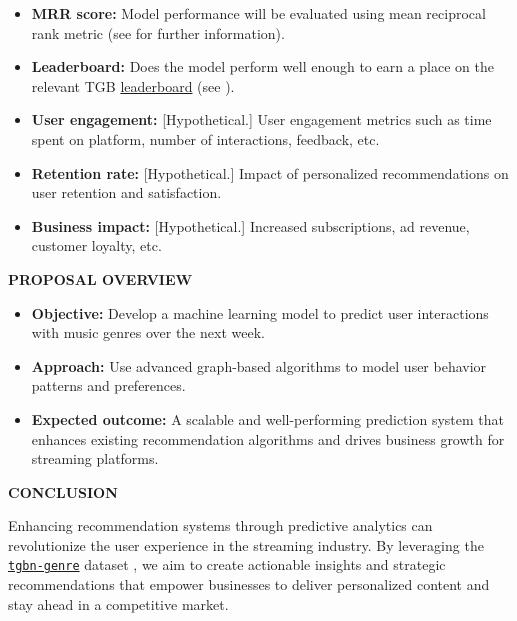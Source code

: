 \documentclass[10pt, letterpaper]{article}
\renewcommand{\section}[1]{%
	    \vspace{\parskip}
		{\large \bfseries\uppercase{#1}}
}
\newcommand{\itemTitle}[1]{%
	{\bfseries{#1}}
}
\begin{document}
\begin{itemize}
\item \itemTitle{MRR score:} Model performance will be evaluated using mean reciprocal rank metric (see \cite{H:2023} for further information).
\item \itemTitle{Leaderboard:} Does the model perform well enough to earn a place on the relevant TGB {\href{https://tgb.complexdatalab.com/docs/leader_nodeprop/\#tgbn-genre}{leaderboard}} (see \cite{H_web:2023}).
\item \itemTitle{User engagement:} [Hypothetical.] User engagement metrics such as time spent on platform, number of interactions, feedback, etc.
\item \itemTitle{Retention rate:} [Hypothetical.] Impact of personalized recommendations on user retention and satisfaction.
\item \itemTitle{Business impact:} [Hypothetical.] Increased subscriptions, ad revenue, customer loyalty, etc.
\end{itemize}
	
\section{Proposal Overview}

\begin{itemize}
\item \itemTitle{Objective:} Develop a machine learning model to 
predict user interactions with music genres over the next week.
\item \itemTitle{Approach:} Use advanced graph-based algorithms 
to model user behavior patterns and preferences.
\item \itemTitle{Expected outcome:} A scalable and well-performing prediction system that enhances existing recommendation algorithms and drives business growth for streaming platforms.
\end{itemize}
	
\section{Conclusion}

Enhancing recommendation systems through predictive analytics can  revolutionize the user experience in the streaming industry. By leveraging the \href{https://tgb.complexdatalab.com/docs/nodeprop/}{\tt{tgbn-genre}} dataset \cite{tgbn-genre}, we aim to create actionable insights and strategic recommendations that empower businesses to deliver personalized content and stay ahead in a competitive market.
\end{document}
